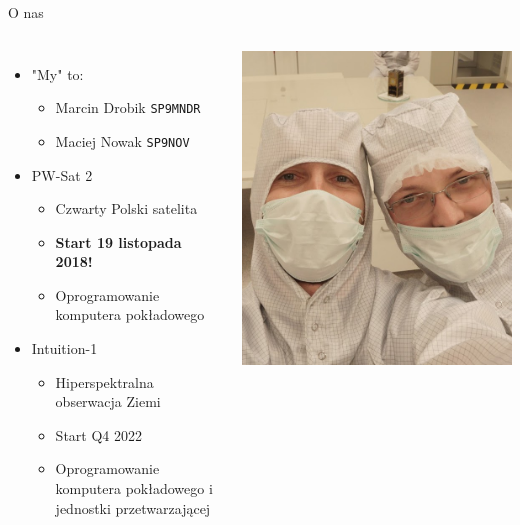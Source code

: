 \documentclass[ignorenonframetext]{beamer}
\begin{document}
\begin{frame}{O nas}
\begin{columns}

\begin{itemize}
	\item "My" to:
	\begin{itemize}
		\item Marcin Drobik \texttt{SP9MNDR}
		\item Maciej Nowak \texttt{SP9NOV}
	\end{itemize}
	\item PW-Sat 2
	\begin{itemize}
		\item Czwarty Polski satelita
		\item \textbf{Start 19 listopada 2018!}
		\item Oprogramowanie komputera pokładowego
	\end{itemize} 
	\item Intuition-1
	\begin{itemize}
		\item Hiperspektralna obserwacja Ziemi
		\item Start Q4 2022
		\item Oprogramowanie komputera pokładowego i jednostki przetwarzającej
	\end{itemize} 
\end{itemize}

\includegraphics[scale=0.3]{images/we.png}
\end{columns}
\end{frame}
\end{document}
